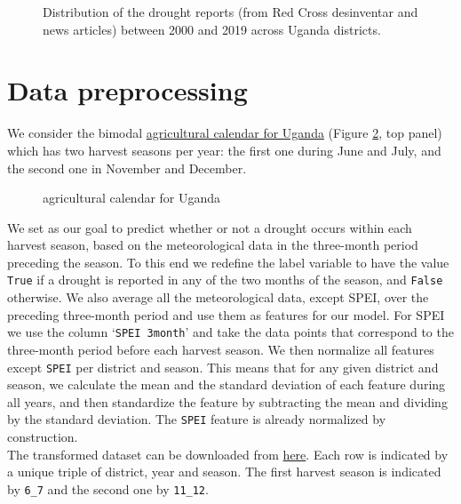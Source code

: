\documentclass[10pt,parskip=half,
toc=sectionentrywithdots,
bibliography=totocnumbered,
captions=tableheading,numbers=noendperiod]{scrartcl}
\begin{document}
\begin{figure}[H]\begin{center}\end{center}\caption{Distribution of the drought reports (from Red Cross desinventar and news
articles) between 2000 and 2019 across Uganda districts.}\label{fig_drought_reports}\end{figure}

\hypertarget{data-preprocessing}{%
\section{Data preprocessing}\label{data-preprocessing}}

We consider the bimodal
\href{https://fews.net/east-africa/uganda}{agricultural calendar for
Uganda} (Figure \ref{fig:calendar}, top panel) which has two harvest
seasons per year: the first one during June and July, and the second one
in November and December.

\begin{figure}[]
\hypertarget{fig:calendar}{%
\begin{center}
\end{center}
\caption{agricultural calendar for Uganda}\label{fig:calendar}
}
\end{figure}

We set as our goal to predict whether or not a drought occurs within
each harvest season, based on the meteorological data in the three-month
period preceding the season. To this end we redefine the label variable
to have the value \texttt{True} if a drought is reported in any of the
two months of the season, and \texttt{False} otherwise. We also average
all the meteorological data, except SPEI, over the preceding three-month
period and use them as features for our model. For SPEI we use the
column `\texttt{SPEI\ 3month}' and take the data points that correspond
to the three-month period before each harvest season. We then normalize
all features except \texttt{SPEI} per district and season. This means
that for any given district and season, we calculate the mean and the
standard deviation of each feature during all years, and then
standardize the feature by subtracting the mean and dividing by the
standard deviation. The \texttt{SPEI} feature is already normalized by
construction.\\
The transformed dataset can be downloaded from
\href{https://github.com/rodekruis/IBF-system/blob/master/trigger-model-development/drought/skill-assessment/Model\%20Event\%20Data/datasets/Uganda_seasonal_normalized.csv}{here}.
Each row is indicated by a unique triple of district, year and season.
The first harvest season is indicated by \texttt{6\_7} and the second
one by \texttt{11\_12}.
\end{document}
